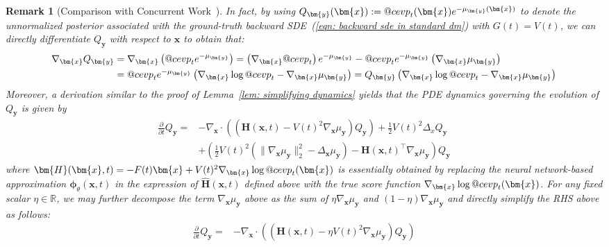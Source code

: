 \documentclass{article}
\makeatletter
\numberwithin{equation}{section}
\newtheorem{remark}[theorem]{Remark}
\def\eqref#1{(\ref{#1})}
\def\vx{{\bm{x}}}
\def\vy{{\bm{y}}}
\def\vphi{{\bm{\phi}}}
\def\mH{{\bm{H}}}
\DeclareRobustCommand{\cev}[1]{%
  {\mathpalette\do@cev{#1}}%
}
\newcommand{\do@cev}[2]{%
  \vbox{\offinterlineskip
    \sbox\z@{$\m@th#1 x$}%
    \ialign{##\cr
      \hidewidth\reflectbox{$\m@th#1\vec{}\mkern4mu$}\hidewidth\cr
      \noalign{\kern-\ht\z@}
      $\m@th#1#2$\cr
    }%
  }%
}
\makeatother
\begin{document}
\begin{remark}[Comparison with Concurrent Work~\cite{skreta2025feynman}]
    In fact, by using $Q_{\vy}(\vx) := \cev{p}_t(\vx)e^{-\mu_{\vy}(\vx)}$ to denote the unnormalized posterior associated with the ground-truth backward SDE~\eqref{eqn: backward sde in standard dm} with $G(t) = V(t)$, we can directly differentiate $Q_{\vy}$ with respect to $\vx$ to obtain that:
    \begin{equation}
    \label{eqn: derivation of grad of Qy}
    \begin{aligned}
    \nabla_{\vx}Q_{\vy} &= \nabla_{\vx}\left(\cev{p}_t e^{-\mu_{\vy}}\right) = \left(\nabla_{\vx}\cev{p}_t\right)e^{-\mu_{\vy}} - \cev{p}_t e^{-\mu_{\vy}}\left(\nabla_{\vx}\mu_{\vy}\right)\\
    &= \cev{p}_t e^{-\mu_{\vy}}\left(\nabla_{\vx}\log \cev{p}_t - \nabla_{\vx}\mu_{\vy}\right) = Q_{\vy}\left(\nabla_{\vx}\log \cev{p}_t - \nabla_{\vx}\mu_{\vy}\right)
    \end{aligned}
    \end{equation}
Moreover, a derivation similar to the proof of Lemma~\ref{lem: simplifying dynamics} yields that the PDE dynamics governing the evolution of $Q_{\vy}$ is given by 
    \begin{equation}
    \begin{aligned}
        \frac{\partial}{\partial t}Q_{\vy} = &-\nabla_{\vx} \cdot \left(\left(\mH(\vx,t)-V(t)^2\nabla_{\vx}\mu_{\vy}\right)Q_{\vy}\right)
        +\frac{1}{2}V(t)^2\Delta_{x}Q_{\vy}\\
        &+\left(\frac{1}{2}V(t)^2\left(\|\nabla_{\vx}\mu_{\vy}\|_2^2-\Delta_{\vx}\mu_{\vy}\right) - \mH(\vx,t)^\intercal\nabla_{\vx}\mu_{\vy}\right)Q_{\vy}
    \end{aligned}    
    \end{equation}
where $\mH(\vx,t) = -F(t)\vx + V(t)^2\nabla_{\vx}\log \cev{p}_{t}(\vx)$ is essentially obtained by replacing the neural network-based approximation $\vphi_{\theta}(\vx,t)$ in the expression of $\widehat{\mH}(\vx,t)$ defined above with the true score function $\nabla_{\vx}\log \cev{p}_{t}(\vx)$. For any fixed scalar $\eta \in \mathbb{R}$, we may further decompose the term $\nabla_{\vx}\mu_{\vy}$ above as the sum of $\eta \nabla_{\vx}\mu_{\vy}$ and $(1-\eta)\nabla_{\vx}\mu_{\vy}$ and directly simplify the RHS above as follows:
    \begin{equation}
    \label{eqn: true unnormalized intermediate dynamics}
        \begin{aligned}
            \frac{\partial}{\partial t}Q_{\vy} 
            = &-\nabla_{\vx} \cdot \left(\left(\mH(\vx,t)-\eta V(t)^2\nabla_{\vx}\mu_{\vy}\right)Q_{\vy}\right)

\end{aligned}
\end{equation}
\end{remark}
\end{document}
